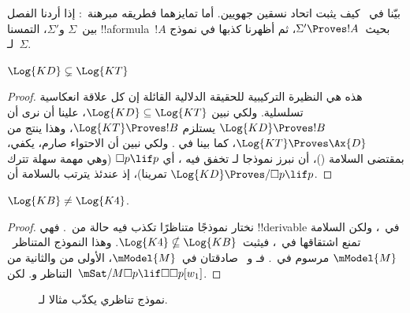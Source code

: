\documentclass[../../../include/open-logic-section]{subfiles}
\begin{document}


بيّنا في~ كيف يثبت اتحاد نسقين جهويين.
أما تمايزهما فطريقه مبرهنة~:
إذا أردنا الفصل بين~$\Sigma$ و$\Sigma'$، التمسنا !!a{formula}~$!A$
بحيث~$\Sigma' \Proves !A$، ثم أظهرنا كذبها في نموذج لـ~$\Sigma$.

\begin{prop}
  $\Log{KD} \subsetneq \Log{KT}$
\end{prop}

\begin{proof} هذه هي النظيرة التركيبية للحقيقة الدلالية القائلة إن كل
  علاقة انعكاسية تسلسلية. ولكي نبين $\Log{KD} \subseteq \Log{KT}$،
  علينا أن نرى أن $\Log{KD} \Proves !B$ يستلزم $\Log{KT} \Proves
  !B$، وهذا ينتج من $\Log{KT} \Proves \Ax{D}$، كما بينا في
  . ولكي نبين
  أن الاحتواء صارم، يكفي، بمقتضى السلامة
  ()، أن نبرز نموذجا لـ تخفق فيه
  ، أي $\Box p \lif p$ (وهي مهمة سهلة تترك تمرينا)، إذ عندئذ
  يترتب بالسلامة أن $\Log{KD} \Proves/ \Box p \lif p$.
\end{proof}

\begin{prop}
  $\Log{KB} \neq \Log{K4}$.
\end{prop}

\begin{proof}
  نختار نموذجًا متناظرًا تكذب فيه حالة من~. فهي
  !!{derivable} في~، ولكن السلامة تمنع اشتقاقها
  في~، فيثبت~$\Log{K4} \nsubseteq \Log{KB}$.
  وهذا النموذج المتناظر~$\mModel{M}$ مرسوم في~.
  فـ و~ صادقتان في~$\mModel{M}$، الأولى من
   والثانية من التناظر
  و.
  لكن~$\mSat/{M}{\Box p \lif \Box\Box p}[w_1]$.
\end{proof}

\begin{figure}[htpb]
  \centering
  \caption{نموذج تناظري يكذّب مثالا لـ.}
\end{figure}
 
\end{document}
